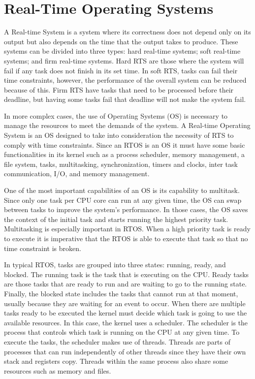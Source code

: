 \section{Real-Time Operating Systems}
\label{section:RTOS}

A Real-time System is a system where its correctness does not depend only on its output but also depends on the time that the output takes to produce. These systems can be divided into three types: hard real-time systems; soft real-time systems; and firm real-time systems. Hard RTS are those where the system will fail if any task does not finish in its set time. In soft RTS, tasks can fail their time constraints, however, the performance of the overall system can be reduced because of this. Firm RTS have tasks that need to be processed before their deadline, but having some tasks fail that deadline will not make the system fail.

In more complex cases, the use of Operating Systems (OS) is necessary to manage the resources to meet the demands of the system. A Real-time Operating System is an OS designed to take into consideration the necessity of RTS to comply with time constraints. Since an RTOS is an OS it must have some basic functionalities in its kernel such as a process scheduler, memory management, a file system, tasks, multitasking, synchronization, timers and clocks, inter task communication, I/O, and memory management. 

One of the most important capabilities of an OS is its capability to multitask. Since only one task per CPU core can run at any given time, the OS can swap between tasks to improve the system's performance. In those cases, the OS saves the context of the initial task and starts running the highest priority task. Multitasking is especially important in RTOS. When a high priority task is ready to execute it is imperative that the RTOS is able to execute that task so that no time constraint is broken.

In typical RTOS, tasks are grouped into three states: running, ready, and blocked. The running task is the task that is executing on the CPU. Ready tasks are those tasks that are ready to run and are waiting to go to the running state. Finally, the blocked state includes the tasks that cannot run at that moment, usually because they are waiting for an event to occur. When there are multiple tasks ready to be executed the kernel must decide which task is going to use the available resources. In this case, the kernel uses a scheduler. The scheduler is the process that controls which task is running on the CPU at any given time. To execute the tasks, the scheduler makes use of threads. Threads are parts of processes that can run independently of other threads since they have their own stack and registers copy. Threads within the same process also share some resources such as memory and files.

